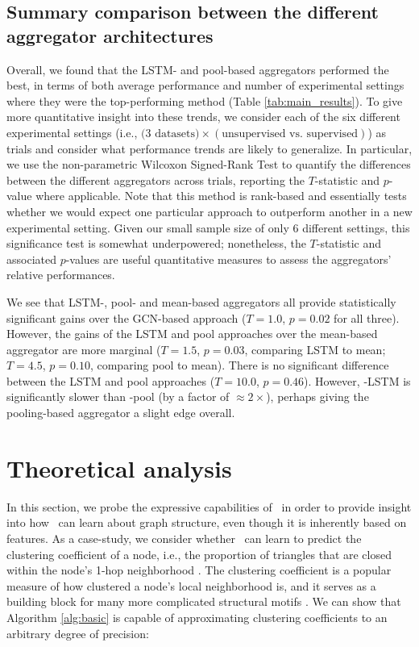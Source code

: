 \subsection{Summary comparison between the different aggregator architectures}\label{sec:sensitivity}

Overall, we found that the LSTM- and pool-based aggregators performed the best, in terms of both average performance and number of experimental settings where they were the top-performing method (Table \ref{tab:main_results}).
To give more quantitative insight into these trends, we consider each of the six different experimental settings (i.e., $\textrm{(3 datasets)} \times (\textrm{unsupervised vs.\ supervised})$) as trials and consider what performance trends are likely to generalize.
In particular, we use the non-parametric Wilcoxon Signed-Rank Test \cite{siegal1956nonparametric} to quantify the differences between the different aggregators across trials, reporting the $T$-statistic and $p$-value where applicable. 
Note that this method is rank-based and essentially tests whether we would expect one particular approach to outperform another in a new experimental setting.
Given our small sample size of only 6 different settings, this significance test is somewhat underpowered; nonetheless, the $T$-statistic and associated $p$-values are useful quantitative measures to assess the aggregators' relative performances. 

We see that LSTM-, pool- and mean-based aggregators all provide statistically significant gains over the GCN-based approach ($T=1.0$, $p=0.02$ for all three). 
However, the gains of the LSTM and pool approaches over the mean-based aggregator are more marginal ($T=1.5$, $p=0.03$, comparing LSTM to mean; $T=4.5$, $p=0.10$, comparing pool to mean).
There is no significant difference between the LSTM and pool approaches ($T=10.0$, $p=0.46$). 
However, \name-LSTM is significantly slower than \name-pool (by a factor of ${\approx}2{\times}$), perhaps giving the pooling-based aggregator a slight edge overall. 


\section{Theoretical analysis}\label{sec:theory}

In this section, we probe the expressive capabilities of \name\ in order to 
provide insight into how \name\ can learn about graph structure, even though it is inherently based on features. 
As a case-study, we consider whether \name\ can learn to predict the clustering coefficient of a node, i.e., the proportion of triangles that are closed within the node's 1-hop neighborhood \cite{watts1998collective}.  The clustering coefficient is a popular  measure of how clustered a node's local neighborhood is, and it serves as a building block for many more complicated structural motifs \cite{benson2016higher}. We can show that Algorithm \ref{alg:basic} is capable of approximating clustering coefficients to an arbitrary degree of precision:

